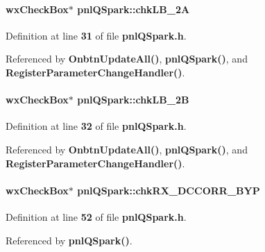 \paragraph[{chk\+L\+B\+\_\+2A}]{\setlength{\rightskip}{0pt plus 5cm}wx\+Check\+Box$\ast$ pnl\+Q\+Spark\+::chk\+L\+B\+\_\+2A}\label{classpnlQSpark_a01cc9f604345b81cb3fbf09db3dc1e4d}


Definition at line {\bf 31} of file {\bf pnl\+Q\+Spark.\+h}.



Referenced by {\bf Onbtn\+Update\+All()}, {\bf pnl\+Q\+Spark()}, and {\bf Register\+Parameter\+Change\+Handler()}.

\paragraph[{chk\+L\+B\+\_\+2B}]{\setlength{\rightskip}{0pt plus 5cm}wx\+Check\+Box$\ast$ pnl\+Q\+Spark\+::chk\+L\+B\+\_\+2B}\label{classpnlQSpark_a0ee31421aa2dc95d4febda6a2f01455d}


Definition at line {\bf 32} of file {\bf pnl\+Q\+Spark.\+h}.



Referenced by {\bf Onbtn\+Update\+All()}, {\bf pnl\+Q\+Spark()}, and {\bf Register\+Parameter\+Change\+Handler()}.

\paragraph[{chk\+R\+X\+\_\+\+D\+C\+C\+O\+R\+R\+\_\+\+B\+YP}]{\setlength{\rightskip}{0pt plus 5cm}wx\+Check\+Box$\ast$ pnl\+Q\+Spark\+::chk\+R\+X\+\_\+\+D\+C\+C\+O\+R\+R\+\_\+\+B\+YP}\label{classpnlQSpark_ab4b209af6b9d861aff347f169bcc86fd}


Definition at line {\bf 52} of file {\bf pnl\+Q\+Spark.\+h}.



Referenced by {\bf pnl\+Q\+Spark()}.


